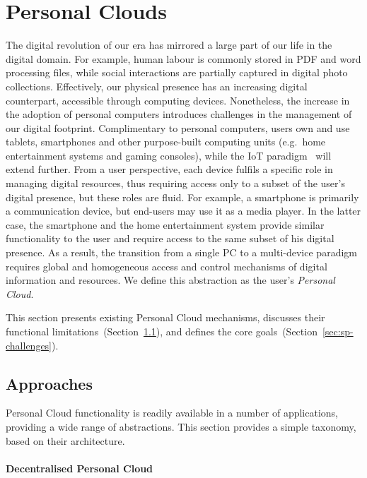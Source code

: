 \section{Personal Clouds}\label{sec:signpost-introduction}

The digital revolution of our era has mirrored a large part of our life in the
digital domain. For example, human labour is commonly stored in PDF and word
processing files, while social interactions are partially captured in digital
photo collections.  Effectively, our physical presence has an increasing digital
counterpart, accessible through computing devices.  Nonetheless, the
increase in the adoption of personal computers introduces challenges in the
management of our digital footprint.  Complimentary to personal computers, users
 own and use tablets, smartphones and other purpose-built computing
units (e.g.~home entertainment systems and gaming consoles), while the IoT
paradigm~ will extend further.  From a user perspective, each
device fulfils a specific role in managing digital resources, thus requiring
access only to a subset of the user's digital presence, but these roles are fluid.
For example, a smartphone is primarily a communication device,
but end-users may use it as a media player. In the latter case, the smartphone
and the home entertainment system provide similar functionality to the user and
require access to the same subset of his digital presence. As a result, the
transition from a single PC to a multi-device paradigm requires global and
homogeneous access and control mechanisms of digital information and
resources. We define this abstraction as the user's \emph{Personal Cloud}. 

This section presents existing Personal Cloud mechanisms, discusses their
functional limitations~(Section~\ref{sec:sp-approaches}), and defines the core
\signpost goals~(Section~\ref{sec:sp-challenges}). 

\subsection{Approaches} \label{sec:sp-approaches}

Personal Cloud functionality is readily available in a number of applications,
providing a wide range of abstractions. This section provides a simple taxonomy,
based on their architecture. 

\paragraph*{Decentralised Personal Cloud}

